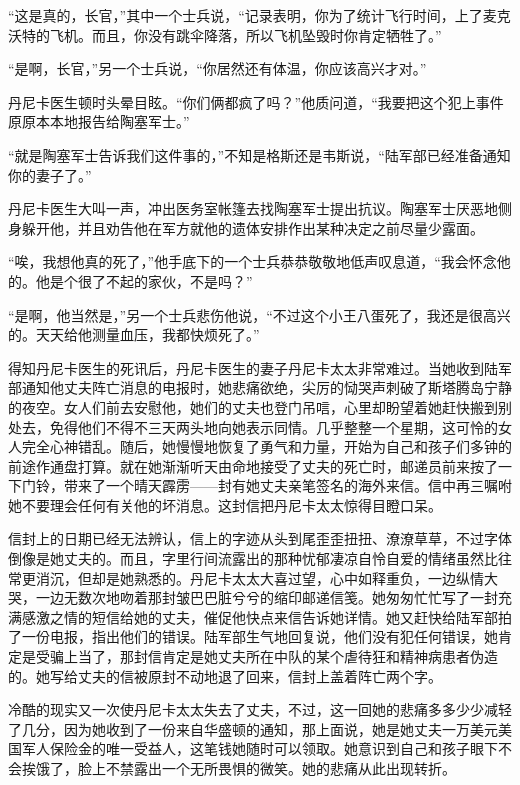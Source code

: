     “这是真的，长官，”其中一个士兵说，“记录表明，你为了统计飞行时间，上了麦克沃特的飞机。而且，你没有跳伞降落，所以飞机坠毁时你肯定牺牲了。”

    “是啊，长官，”另一个士兵说，“你居然还有体温，你应该高兴才对。”

    丹尼卡医生顿时头晕目眩。“你们俩都疯了吗？”他质问道，“我要把这个犯上事件原原本本地报告给陶塞军士。”

    “就是陶塞军士告诉我们这件事的，”不知是格斯还是韦斯说，“陆军部已经准备通知你的妻子了。”

    丹尼卡医生大叫一声，冲出医务室帐篷去找陶塞军士提出抗议。陶塞军士厌恶地侧身躲开他，并且劝告他在军方就他的遗体安排作出某种决定之前尽量少露面。

    “唉，我想他真的死了，”他手底下的一个士兵恭恭敬敬地低声叹息道，“我会怀念他的。他是个很了不起的家伙，不是吗？”

 


    “是啊，他当然是，”另一个士兵悲伤他说，“不过这个小王八蛋死了，我还是很高兴的。天天给他测量血压，我都快烦死了。”

    得知丹尼卡医生的死讯后，丹尼卡医生的妻子丹尼卡太太非常难过。当她收到陆军部通知他丈夫阵亡消息的电报时，她悲痛欲绝，尖厉的恸哭声刺破了斯塔腾岛宁静的夜空。女人们前去安慰他，她们的丈夫也登门吊唁，心里却盼望着她赶快搬到别处去，免得他们不得不三天两头地向她表示同情。几乎整整一个星期，这可怜的女人完全心神错乱。随后，她慢慢地恢复了勇气和力量，开始为自己和孩子们多钟的前途作通盘打算。就在她渐渐听天由命地接受了丈夫的死亡时，邮递员前来按了一下门铃，带来了一个晴天霹雳——封有她丈夫亲笔签名的海外来信。信中再三嘱咐她不要理会任何有关他的坏消息。这封信把丹尼卡太太惊得目瞪口呆。

    信封上的日期已经无法辨认，信上的字迹从头到尾歪歪扭扭、潦潦草草，不过字体倒像是她丈夫的。而且，字里行间流露出的那种忧郁凄凉自怜自爱的情绪虽然比往常更消沉，但却是她熟悉的。丹尼卡太太大喜过望，心中如释重负，一边纵情大哭，一边无数次地吻着那封皱巴巴脏兮兮的缩印邮递信笺。她匆匆忙忙写了一封充满感激之情的短信给她的丈夫，催促他快点来信告诉她详情。她又赶快给陆军部拍了一份电报，指出他们的错误。陆军部生气地回复说，他们没有犯任何错误，她肯定是受骗上当了，那封信肯定是她丈夫所在中队的某个虐待狂和精神病患者伪造的。她写给丈夫的信被原封不动地退了回来，信封上盖着阵亡两个字。

    冷酷的现实又一次使丹尼卡太太失去了丈夫，不过，这一回她的悲痛多多少少减轻了几分，因为她收到了一份来自华盛顿的通知，那上面说，她是她丈夫一万美元美国军人保险金的唯一受益人，这笔钱她随时可以领取。她意识到自己和孩子眼下不会挨饿了，脸上不禁露出一个无所畏惧的微笑。她的悲痛从此出现转折。

